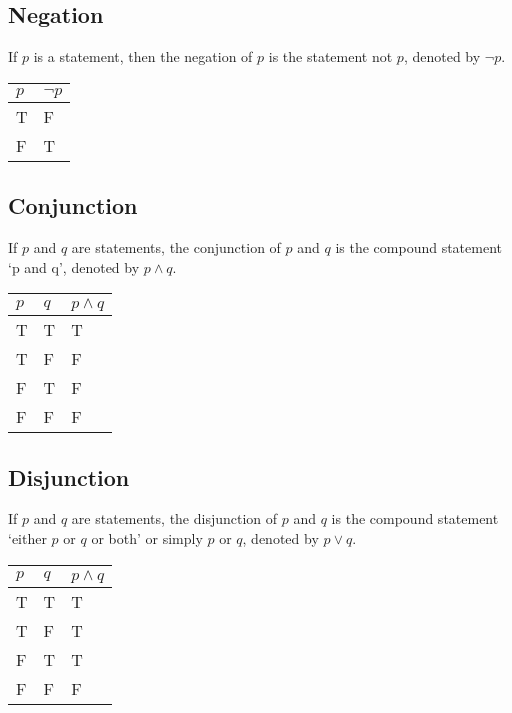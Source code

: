 \subsection*{Negation}
If $p$ is a statement, then the negation of $p$ is the statement not $p$, denoted by $¬p$. 
\begin{table}[H]
    \centering
    \begin{tabular}{x{0.1\textwidth} x{0.1\textwidth}}
        \textbf{$p$} & \textbf{$¬p$}\\
        \hline
        \hline
        T & F \\
        \hline
        F & T \\
        \hline
    \end{tabular}
\end{table}

\subsection*{Conjunction}
If $p$ and $q$ are statements, the conjunction of $p$ and $q$ is the compound statement `p and q', denoted by $p \wedge q$. 
\begin{table}[H]
    \centering
    \begin{tabular}{x{0.1\textwidth} x{0.1\textwidth} x{0.1\textwidth}}
        $p$ & $q$ & $p \wedge q$\\
        \hline
        \hline
        T & T & T\\
        \hline
        T & F & F \\
        \hline
        F & T & F \\
        \hline
        F & F & F\\
        \hline
    \end{tabular}
\end{table}

\subsection*{Disjunction}
If $p$ and $q$ are statements, the disjunction of $p$ and $q$ is the compound statement `either $p$ or $q$ or both' or simply $p$ or $q$, denoted by $p \vee q$.
\begin{table}[H]
    \centering
    \begin{tabular}{x{0.1\textwidth} x{0.1\textwidth} x{0.1\textwidth}}
        $p$ & $q$ & $p \wedge q$\\
        \hline
        \hline
        T & T & T\\
        \hline
        T & F & T \\
        \hline
        F & T & T \\
        \hline
        F & F & F\\
        \hline
    \end{tabular}
\end{table}

